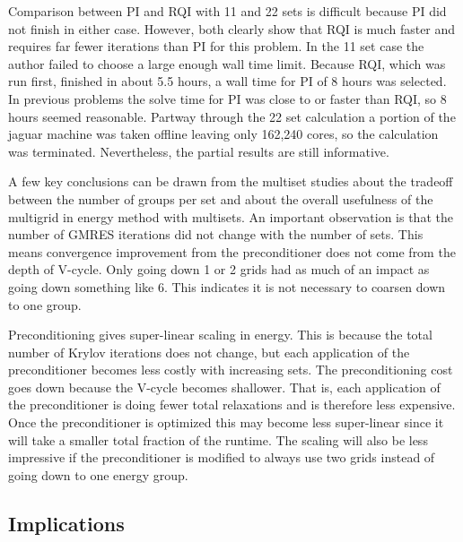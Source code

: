 Comparison between PI and RQI with 11 and 22 sets is difficult because PI did not finish in either case. However, both clearly show that RQI is much faster and requires far fewer iterations than PI for this problem. In the 11 set case the author failed to choose a large enough wall time limit. Because RQI, which was run first, finished in about 5.5 hours, a wall time for PI of 8 hours was selected. In previous problems the solve time for PI was close to or faster than RQI, so 8 hours seemed reasonable. Partway through the 22 set calculation a portion of the jaguar machine was taken offline leaving only 162,240 cores, so the calculation was terminated. Nevertheless, the partial results are still informative. 

A few key conclusions can be drawn from the multiset studies about the tradeoff between the number of groups per set and about the overall usefulness of the multigrid in energy method with multisets. An important observation is that the number of GMRES iterations did not change with the number of sets. This means convergence improvement from the preconditioner does not come from the depth of V-cycle. Only going down 1 or 2 grids had as much of an impact as going down something like 6. This indicates it is not necessary to coarsen down to one group. 

Preconditioning gives super-linear scaling in energy. This is because the total number of Krylov iterations does not change, but each application of the preconditioner becomes less costly with increasing sets. The preconditioning cost goes down because the V-cycle becomes shallower. That is, each application of the preconditioner is doing fewer total relaxations and is therefore less expensive. Once the preconditioner is optimized this may become less super-linear since it will take a smaller total fraction of the runtime. The scaling will also be less impressive if the preconditioner is modified to always use two grids instead of going down to one energy group. 

\subsection{Implications}



